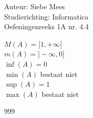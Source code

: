 \documentclass[a4paper]{article}
\begin{document}
  
\noindent \large Auteur: Siebe Mees \\
\noindent \large Studierichting: Informatica\\
\noindent \large Oefeningenreeks 1A nr. 4.4\\

\medskip

\normalsize

$M(A) = [1,+\infty[$\\

$m(A) = ]-\infty, 0]$\\

$\inf(A) = 0$\\

$\min(A)$ bestaat niet\\

$\sup(A) = 1$\\

$\max (A)$ bestaat niet\\

\begin{thebibliography}{999}

\end{thebibliography}
\end{document}
